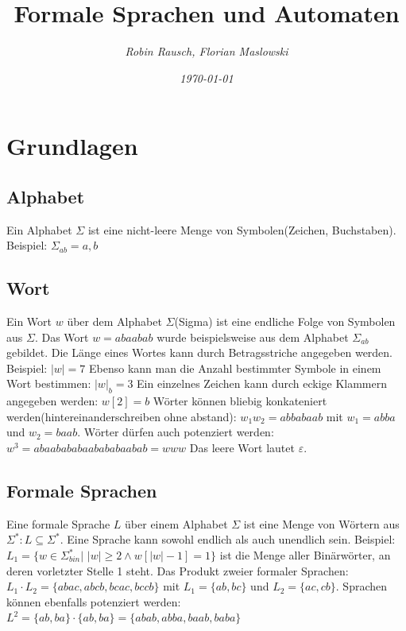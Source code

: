 \documentclass[12pt,a4paper]{article}
\title{Formale Sprachen und Automaten}
\author{\slshape Robin Rausch, Florian Maslowski}
\date{\slshape \today}
\begin{document}
\maketitle
\tableofcontents
\newpage
{}
\section{Grundlagen}
\subsection{Alphabet}
Ein Alphabet $\varSigma$ ist eine nicht-leere Menge von Symbolen(Zeichen, Buchstaben).
Beispiel: $\varSigma_{ab} = { a, b }$

\subsection{Wort}
Ein Wort $w$ über dem Alphabet $\varSigma$(Sigma) ist eine endliche Folge von Symbolen aus $\varSigma$. Das Wort $w = abaabab$ wurde beispielsweise aus dem Alphabet $\varSigma_{ab}$ gebildet.\newline
Die Länge eines Wortes kann durch Betragsstriche angegeben werden. Beispiel: $|w| = 7$\newline
Ebenso kann man die Anzahl bestimmter Symbole in einem Wort bestimmen: $|w|_b = 3$\newline
Ein einzelnes Zeichen kann durch eckige Klammern angegeben werden: $w[2] = b$\newline
Wörter können bliebig konkateniert werden(hintereinanderschreiben ohne abstand): $w_1w_2 = abbabaab$ mit $w_1 = abba$ und $w_2 = baab$.\newline
Wörter dürfen auch potenziert werden: $w^3 = abaabababaabababaabab = www$\newline
Das leere Wort lautet $\varepsilon$.

\subsection{Formale Sprachen}
Eine formale Sprache $L$ über einem Alphabet $\varSigma$ ist eine Menge von Wörtern aus $\varSigma^*: L \subseteq \varSigma^*$. Eine Sprache kann sowohl endlich als auch unendlich sein.\newline
Beispiel: $L_1 = \{w \in \varSigma_{bin}^* |$ $|w| \geqslant 2 \wedge w[|w| - 1] = 1\}$ ist die Menge aller Binärwörter, an deren vorletzter Stelle 1 steht.\newline
Das Produkt zweier formaler Sprachen: $L_1 \cdot L_2 = \{abac, abcb, bcac, bccb\}$ mit $L_1 = \{ab, bc\}$ und $L_2 = \{ ac, cb\}$.\newline
Sprachen können ebenfalls potenziert werden: $L^2 = \{ab, ba\} \cdot \{ab, ba\} = \{ abab, abba, baab, baba\}$
\end{document}
